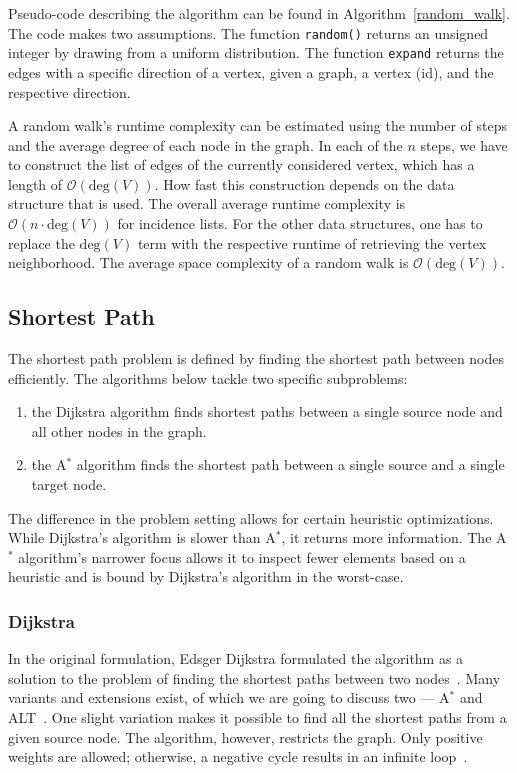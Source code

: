                 Pseudo-code describing the algorithm can be found in Algorithm~\ref{random_walk}. 
                The code makes two assumptions. The function \texttt{random()} returns an unsigned integer by drawing from a uniform distribution. 
                The function \texttt{expand} returns the edges with a specific direction of a vertex, given a graph, a vertex (id), and the respective direction.
                
                A random walk's runtime complexity can be estimated using the number of steps and the average degree of each node in the graph. 
                In each of the $n$ steps, we have to construct the list of edges of the currently considered vertex, which has a length of $\mathcal{O}(\text{deg}(V))$. 
                How fast this construction depends on the data structure that is used. 
                The overall average runtime complexity is $\mathcal{O}(n \cdot \text{deg}(V))$ for incidence lists. 
                For the other data structures, one has to replace the $\text{deg}(V)$ term with the respective runtime of retrieving the vertex neighborhood. 
                The average space complexity of a random walk is $\mathcal{O}(\text{deg}(V))$.
        
    \subsection{Shortest Path}
        The shortest path problem is defined by finding the shortest path between nodes efficiently.
        The algorithms below tackle two specific subproblems:
        \begin{enumerate}
         \item the Dijkstra algorithm finds shortest paths between a single source node and all other nodes in the graph.
         \item the A$^*$ algorithm finds the shortest path between a single source and a single target node.
        \end{enumerate}
        The difference in the problem setting allows for certain heuristic optimizations. 
        While Dijkstra's algorithm is slower than A$^*$, it returns more information.
        The A$^*$ algorithm's narrower focus allows it to inspect fewer elements based on a heuristic and is bound by Dijkstra's algorithm in the worst-case.

        \subsubsection*{Dijkstra} 
            In the original formulation, Edsger Dijkstra formulated the algorithm as a solution to the problem of finding the shortest paths between two nodes~\autocite{dijkstra1959note}. 
            Many variants and extensions exist, of which we are going to discuss two --- A$^*$ and ALT~\autocite{hart1968formal, goldberg2005computing}. 
            One slight variation makes it possible to find all the shortest paths from a given source node.
            The algorithm, however, restricts the graph.
            Only positive weights are allowed; otherwise, a negative cycle results in an infinite loop~\autocite{cormen2009introduction}. 
            
